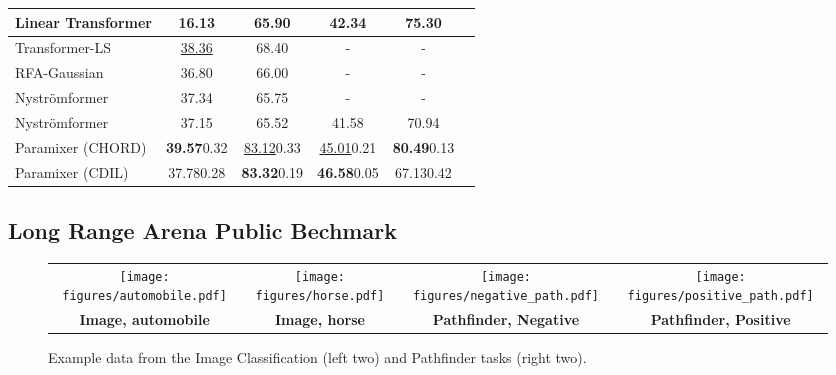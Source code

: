 \documentclass{article}
\begin{document}
\begin{table*}[t]
\begin{tabular}{lccccc}
\hline
Linear Transformer \cite{tay2020long}  & 16.13 & 65.90 & 42.34 & 75.30\\
\hline
Transformer-LS \cite{zhu2021long} & \underline{38.36} & 68.40 & -    &  -    \\
\hline
RFA-Gaussian \cite{peng2021random}   & 36.80 & 66.00 & -     & -    \\
\hline
Nystr\"omformer \cite{zhu2021long}  & 37.34 & 65.75 & -     & -    \\
Nystr\"omformer \cite{nystromformer}  & 37.15 & 65.52 & 41.58 & 70.94\\
\hline
Paramixer (CHORD) & \textbf{39.57}0.32 & \underline{83.12}0.33 &  \underline{45.01}0.21 &  \textbf{80.49}0.13\\
Paramixer (CDIL) & 37.780.28 & \textbf{83.32}0.19 &  \textbf{46.58}0.05 &  67.130.42\\
\hline
\hline
\end{tabular}
\vspace{3.4mm}
\end{table*}

\subsection{Long Range Arena Public Bechmark}

\setlength\tabcolsep{1.1pt}
\begin{figure}[t]
	\begin{center}
	\begin{tabular}{cccc}
		\texttt{[image: figures/automobile.pdf]} &
		\texttt{[image: figures/horse.pdf]} &
		\texttt{[image: figures/negative\_path.pdf]} &
		\texttt{[image: figures/positive\_path.pdf]}\\
		{\tiny {\bf Image, automobile}} &
		{\tiny {\bf Image, horse}}&
		{\tiny {\bf Pathfinder, Negative}} & 
		{\tiny {\bf Pathfinder, Positive}}\\
 	\end{tabular}
 	\vspace{2mm}
	\end{center}
	\caption{Example data from the Image Classification (left two) and Pathfinder tasks (right two).}
	\label{fig:lraex}
\end{figure}
\end{document}
